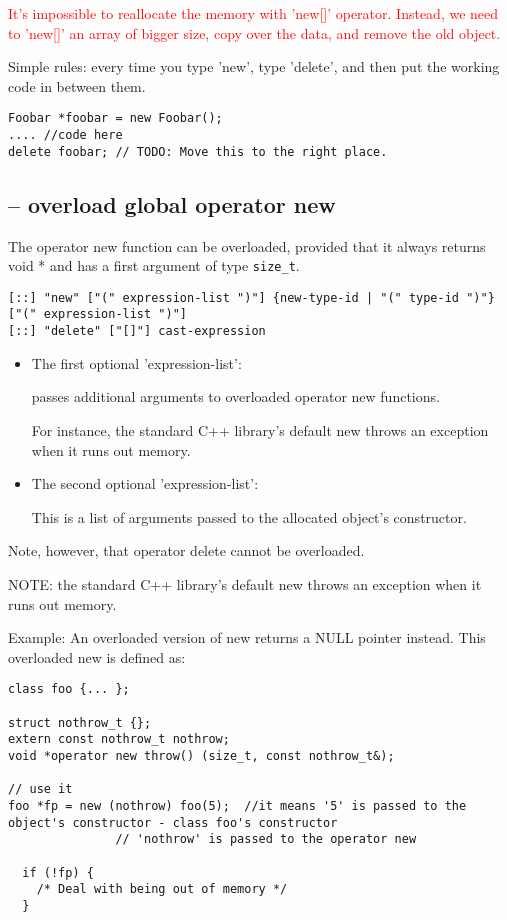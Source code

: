\textcolor{red}{It's impossible to reallocate the memory with 'new[]' operator.
Instead, we need to 'new[]' an array of bigger size, copy over the data, and
remove the old object.}


\begin{mdframed}
Simple rules: every time you type 'new', type 'delete', and then put the working
code in between them.

\begin{verbatim}
Foobar *foobar = new Foobar();
.... //code here
delete foobar; // TODO: Move this to the right place.
\end{verbatim}
\end{mdframed}

\subsection{-- overload global operator new}

The operator new function can be overloaded, provided that it always returns
void * and has a first argument of type \verb!size_t!.

\begin{verbatim}
[::] "new" ["(" expression-list ")"] {new-type-id | "(" type-id ")"} ["(" expression-list ")"]
[::] "delete" ["[]"] cast-expression
\end{verbatim}
\begin{itemize}
  \item  The first optional 'expression-list':
  
  passes additional arguments to overloaded operator new functions.
   
  For instance, the standard C++ library's default new throws an exception when it runs out memory.
   
  
  \item The second optional 'expression-list': 
  
   This is a list of arguments passed to the allocated object's constructor. 

\end{itemize}
Note, however, that operator delete cannot be overloaded. 


NOTE: the standard C++ library's default new throws an exception when it runs
out memory.


Example: An overloaded version of new returns a NULL pointer instead. This overloaded new is defined as:
\begin{verbatim}
class foo {... };

struct nothrow_t {};
extern const nothrow_t nothrow;
void *operator new throw() (size_t, const nothrow_t&);

// use it
foo *fp = new (nothrow) foo(5);  //it means '5' is passed to the object's constructor - class foo's constructor
               // 'nothrow' is passed to the operator new

  if (!fp) {
    /* Deal with being out of memory */
  }

\end{verbatim}



